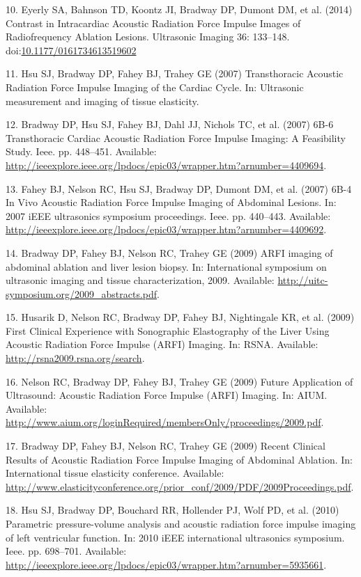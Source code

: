 \documentclass[]{article}
\begin{document}
10. Eyerly SA, Bahnson TD, Koontz JI, Bradway DP, Dumont DM, et al.
(2014) Contrast in Intracardiac Acoustic Radiation Force Impulse Images
of Radiofrequency Ablation Lesions. Ultrasonic Imaging 36: 133--148.
doi:\href{http://dx.doi.org/10.1177/0161734613519602}{10.1177/0161734613519602}

11. Hsu SJ, Bradway DP, Fahey BJ, Trahey GE (2007) Transthoracic
Acoustic Radiation Force Impulse Imaging of the Cardiac Cycle. In:
Ultrasonic measurement and imaging of tissue elasticity.

12. Bradway DP, Hsu SJ, Fahey BJ, Dahl JJ, Nichols TC, et al. (2007)
6B-6 Transthoracic Cardiac Acoustic Radiation Force Impulse Imaging: A
Feasibility Study. Ieee. pp. 448--451. Available:
\url{http://ieeexplore.ieee.org/lpdocs/epic03/wrapper.htm?arnumber=4409694}.

13. Fahey BJ, Nelson RC, Hsu SJ, Bradway DP, Dumont DM, et al. (2007)
6B-4 In Vivo Acoustic Radiation Force Impulse Imaging of Abdominal
Lesions. In: 2007 iEEE ultrasonics symposium proceedings. Ieee. pp.
440--443. Available:
\url{http://ieeexplore.ieee.org/lpdocs/epic03/wrapper.htm?arnumber=4409692}.

14. Bradway DP, Fahey BJ, Nelson RC, Trahey GE (2009) ARFI imaging of
abdominal ablation and liver lesion biopsy. In: International symposium
on ultrasonic imaging and tissue characterization, 2009. Available:
\url{http://uitc-symposium.org/2009_abstracts.pdf}.

15. Husarik D, Nelson RC, Bradway DP, Fahey BJ, Nightingale KR, et al.
(2009) First Clinical Experience with Sonographic Elastography of the
Liver Using Acoustic Radiation Force Impulse (ARFI) Imaging. In: RSNA.
Available: \url{http://rsna2009.rsna.org/search}.

16. Nelson RC, Bradway DP, Fahey BJ, Trahey GE (2009) Future Application
of Ultrasound: Acoustic Radiation Force Impulse (ARFI) Imaging. In:
AIUM. Available:
\url{http://www.aium.org/loginRequired/membersOnly/proceedings/2009.pdf}.

17. Bradway DP, Fahey BJ, Nelson RC, Trahey GE (2009) Recent Clinical
Results of Acoustic Radiation Force Impulse Imaging of Abdominal
Ablation. In: International tissue elasticity conference. Available:
\url{http://www.elasticityconference.org/prior_conf/2009/PDF/2009Proceedings.pdf}.

18. Hsu SJ, Bradway DP, Bouchard RR, Hollender PJ, Wolf PD, et al.
(2010) Parametric pressure-volume analysis and acoustic radiation force
impulse imaging of left ventricular function. In: 2010 iEEE
international ultrasonics symposium. Ieee. pp. 698--701. Available:
\url{http://ieeexplore.ieee.org/lpdocs/epic03/wrapper.htm?arnumber=5935661}.
\end{document}
